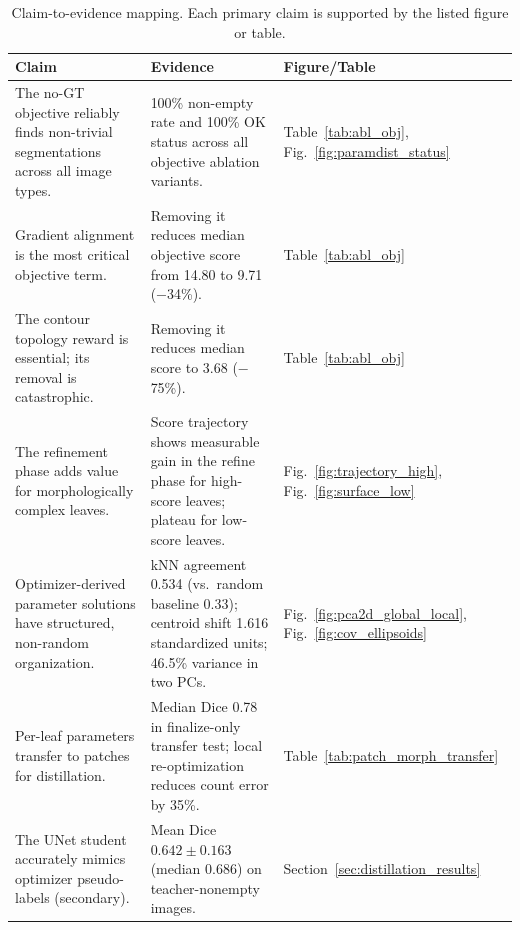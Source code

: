 \documentclass[11pt,a4paper]{article}
\begin{document}
\begin{table}[t]
\centering
\caption{Claim-to-evidence mapping. Each primary claim is supported by the listed figure or table.}
\label{tab:claim_evidence}
\begin{tabular}{p{} p{} p{}}
\toprule
\textbf{Claim} & \textbf{Evidence} & \textbf{Figure/Table} \\
\midrule
The no-GT objective reliably finds non-trivial segmentations across all image types. & 100\% non-empty rate and 100\% OK status across all objective ablation variants. & Table~\ref{tab:abl_obj}, Fig.~\ref{fig:paramdist_status} \\
\midrule
Gradient alignment is the most critical objective term. & Removing it reduces median objective score from 14.80 to 9.71 ($-$34\%). & Table~\ref{tab:abl_obj} \\
\midrule
The contour topology reward is essential; its removal is catastrophic. & Removing it reduces median score to 3.68 ($-$75\%). & Table~\ref{tab:abl_obj} \\
\midrule
The refinement phase adds value for morphologically complex leaves. & Score trajectory shows measurable gain in the refine phase for high-score leaves; plateau for low-score leaves. & Fig.~\ref{fig:trajectory_high}, Fig.~\ref{fig:surface_low} \\
\midrule
Optimizer-derived parameter solutions have structured, non-random organization. & kNN agreement 0.534 (vs.\ random baseline 0.33); centroid shift 1.616 standardized units; 46.5\% variance in two PCs. & Fig.~\ref{fig:pca2d_global_local}, Fig.~\ref{fig:cov_ellipsoids} \\
\midrule
Per-leaf parameters transfer to patches for distillation. & Median Dice 0.78 in finalize-only transfer test; local re-optimization reduces count error by 35\%. & Table~\ref{tab:patch_morph_transfer} \\
\midrule
The UNet student accurately mimics optimizer pseudo-labels (secondary). & Mean Dice $0.642\pm0.163$ (median 0.686) on teacher-nonempty images. & Section~\ref{sec:distillation_results} \\
\bottomrule
\end{tabular}
\end{table}

\end{document}
